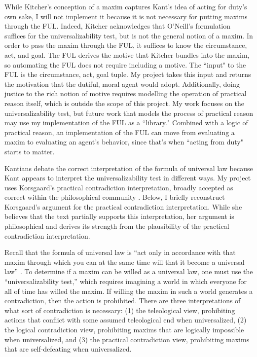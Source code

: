 \begin{isabellebody}
\begin{isamarkuptext}
While Kitcher's conception of a maxim captures Kant's idea of acting for duty's own sake, I will not implement it 
because it is not necessary for putting maxims through the FUL. Indeed, Kitcher acknowledges that 
O'Neill's formulation suffices for the universalizability test, but is not the general notion of a maxim.
In order to pass the maxim through the FUL, it suffices to know the circumstance, act, and goal. The FUL
derives the motive that Kitcher bundles into the maxim, so automating the FUL does not require 
including a motive. The ``input" to the FUL is the circumstance, act, goal tuple. My project takes 
this input and returns the motivation that the dutiful, moral agent would adopt. Additionally, doing
justice to the rich notion of motive requires modelling the operation of practical reason itself, 
which is outside the scope of this project. My work focuses on the universalizability test, but future work that 
models the process of practical reason may use my implementation of the FUL as a ``library." Combined 
with a logic of practical reason, an implementation of the FUL can move from evaluating a maxim to 
evaluating an agent's behavior, since that's when ``acting from duty" starts to matter.%
\end{isamarkuptext}\isamarkuptrue%
%
\isadelimdocument
%
\endisadelimdocument
%
\isatagdocument
%
\isamarkuptrue%
%
\endisatagdocument
{\isafolddocument}%
%
\isadelimdocument
%
\endisadelimdocument
%
\begin{isamarkuptext}%
Kantians debate the correct interpretation of the formula of universal law because Kant appears to 
interpret the universalizability test in different ways. My project uses Korsgaard's practical contradiction 
interpretation, broadly accepted as correct within the philosophical community \cite[177]{ebelsduggan}.
Below, I briefly reconstruct Korsgaard's argument for the practical contradiction interpretation. While 
she believes that the text partially supports this interpretation, her argument is philosophical and 
derives its strength from the plausibility of the practical contradiction interpretation.

Recall that the formula of universal law is “act only in accordance with that maxim through which you can at the 
same time will that it become a universal law” \cite[4:421]{groundwork}. To determine if a maxim can be willed as a 
universal law, one must use the “universalizability test,” which requires imagining a world in which 
everyone for all of time has willed the maxim. If willing the maxim in such a world generates a contradiction, 
then the action is prohibited. There are three interpretations of what sort of contradiction is necessary: 
(1) the teleological view, prohibiting actions that conflict with some assumed teleological end when 
universalized, (2) the logical contradiction view, prohibiting maxims that are logically impossible 
when universalized, and (3) the practical contradiction view, prohibiting maxims that are self-defeating 
when universalized.


\end{isamarkuptext}
\end{isabellebody}
